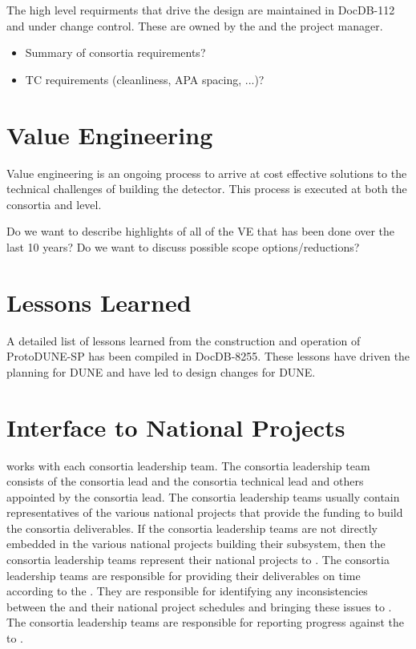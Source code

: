 The high level  requirments that drive the  design are
maintained in DocDB-112 and under change control. These are owned by
the   and the  project manager.

\begin{itemize}
 \item Summary of consortia requirements?
 \item TC requirements (cleanliness, APA spacing, ...)?
\end{itemize}


\section{Value Engineering}
\label{sec:fdsp-coord-ve}

Value engineering is an ongoing process to arrive at cost effective
solutions to the technical challenges of building the 
detector.  This process is executed at both the consortia and
 level.

Do we want to describe highlights of all of the VE that has been done
over the last 10 years? Do we want to discuss possible scope options/reductions?

\section{Lessons Learned}
\label{sec:fdsp-coord-lessons}

A detailed list of lessons learned from the construction and operation
of ProtoDUNE-SP has been compiled in DocDB-8255. These lessons have driven the
planning for DUNE and have led to design changes for DUNE.

\section{Interface to National Projects}
\label{sec:fdsp-coord-national}

  works with each consortia leadership team. The
consortia leadership team consists of the consortia lead and the
consortia technical lead and others appointed by the consortia
lead. The consortia leadership teams usually contain representatives
of the various national projects that provide the funding to build the consortia
deliverables. If the consortia leadership teams are not directly
embedded in the various national projects building their subsystem,
then the consortia leadership teams represent their national projects
to . The consortia leadership teams are responsible for
providing their deliverables on time according to the
. They are responsible for identifying any inconsistencies
between the  and their national project schedules and
bringing these issues to . The consortia leadership teams
are responsible for reporting progress against the  to
.

